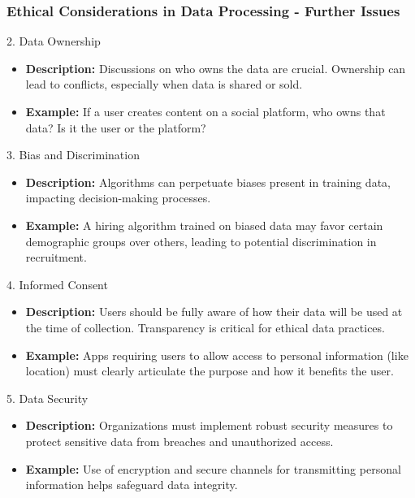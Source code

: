 \documentclass{beamer}
\begin{document}
\begin{frame}[fragile]
    \frametitle{Ethical Considerations in Data Processing - Further Issues}
    \begin{block}{2. Data Ownership}
        \begin{itemize}
            \item \textbf{Description:} Discussions on who owns the data are crucial. Ownership can lead to conflicts, especially when data is shared or sold.
            \item \textbf{Example:} If a user creates content on a social platform, who owns that data? Is it the user or the platform?
        \end{itemize}
    \end{block}

    \begin{block}{3. Bias and Discrimination}
        \begin{itemize}
            \item \textbf{Description:} Algorithms can perpetuate biases present in training data, impacting decision-making processes.
            \item \textbf{Example:} A hiring algorithm trained on biased data may favor certain demographic groups over others, leading to potential discrimination in recruitment.
        \end{itemize}
    \end{block}

    \begin{block}{4. Informed Consent}
        \begin{itemize}
            \item \textbf{Description:} Users should be fully aware of how their data will be used at the time of collection. Transparency is critical for ethical data practices.
            \item \textbf{Example:} Apps requiring users to allow access to personal information (like location) must clearly articulate the purpose and how it benefits the user.
        \end{itemize}
    \end{block}

    \begin{block}{5. Data Security}
        \begin{itemize}
            \item \textbf{Description:} Organizations must implement robust security measures to protect sensitive data from breaches and unauthorized access.
            \item \textbf{Example:} Use of encryption and secure channels for transmitting personal information helps safeguard data integrity.
        \end{itemize}
    \end{block}
\end{frame}
\end{document}
